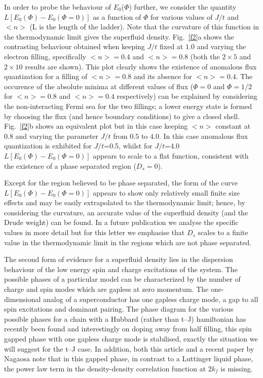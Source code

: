 {In order to probe the behaviour of
 $E_0$($\Phi$) further, we consider the quantity
 $L \left [{E_0(\Phi)-E_0(\Phi =0)}\right ]$ as a function of $\Phi$
 for various values of $J/t$ and $\big < n\big >$ (L is the length of the
ladder).
Note that the curvature of this function in the thermodynamic
limit gives the superfluid density.
Fig.\ \ref{f2}a shows the contrasting behaviour obtained when
keeping $J/t$ fixed at $1.0$
and varying
the electron  filling, specifically
$\big <n\big >=0.4$ and
$\big <n\big >=0.8$ (both the $2\times 5$ and
$2\times 10$ results are shown).
This plot  clearly
shows the existence of  anomalous flux quantization
for a filling of
$\big <n\big >=0.8$ and its absence for
$\big <n\big >=0.4$.
The occurence of the absolute minima at different values of flux
($\Phi =0$ and $\Phi =1/2$ for
$\big <n\big >=0.8$ and
$\big <n\big >=0.4$ respectively)
can be explained by considering the non-interacting Fermi sea for the two
fillings;
a lower energy state is formed by choosing the flux (and hence
boundary conditions) to give a closed shell.
Fig.\ \ref{f2}b shows an equivalent plot but in this case keeping
$\big <n\big >$ constant at $0.8$ and varying the parameter $J/t$ from $0.5$
to $4.0$.
In this case
   anomalous flux quantization is exhibited  for $J/t$=0.5, whilst for
$J/t$=4.0
 $L \left [{E_0(\Phi)-E_0(\Phi =0)}\right ]$
 appears to  scale to a flat function, consistent with the
 existence of a phase separated region ($D_s=0$).

Except for the region believed to be phase separated,
the form of the curve
$L \left [{E_0(\Phi)-E_0(\Phi =0)}\right ]$
appears to show only relatively small finite size effects and
may be easily extrapolated to the thermodynamic limit;
hence, by considering the  curvature, an accurate value of the superfluid
density
(and the Drude weight)
can be found.
In a future publication \cite{chdp}
we analyse the specific values in more detail but
for this letter we emphasise that $D_s$ scales
to a finite value in the thermodynamic limit
in the regions which are not phase separated.


\bigskip
The second form of evidence for a superfluid density lies in the dispersion
behaviour of the
low energy spin and charge excitations  of the system.
The possible phases of a particular  model can be characterized
by the number of charge and spin modes which are gapless at zero momentum.
The one-dimensional analog of a superconductor has
one gapless charge mode, a gap to all spin excitations and dominant pairing.
The phase diagram for the
various possible phases for a chain with a Hubbard (rather than t--J)
hamiltonian
has recently been found \cite{fisher} and interestingly  on  doping away
from half filling, this spin gapped phase with one gapless charge mode is
stabilised, exactly the
situation we will  suggest for the t--J case.
In addition, both this article and a recent paper by Nagaosa \cite{nagaosa}
note that
in this gapped phase, in contrast to a Luttinger liquid phase,
the power law term in the density-density correlation function
at $2k_f$ is missing.


}

